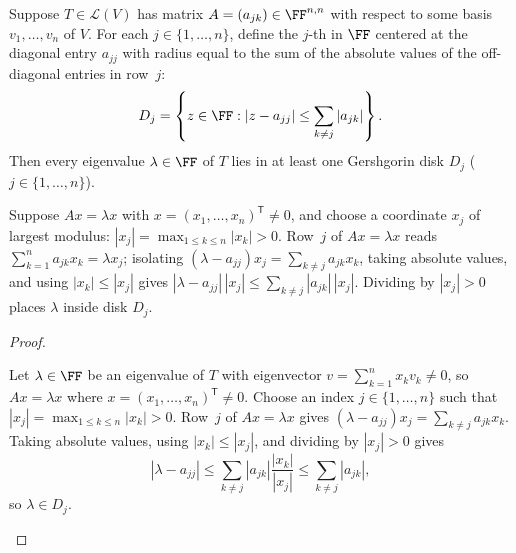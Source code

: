 \documentclass[10pt]{scrartcl}
\newcommand{\LL}{\mathcal L}\newcommand{\PP}{\mathcal P}\newcommand{\MM}{\mathcal M}
\begin{document}
\begin{theorem*}
  Suppose $T\in\LL(V)$ has matrix $A=(a_{jk})\in\FF^{n,n}$ with respect to some basis $v_1,\dots,v_n$ of $V$. For each $j\in\{1,\dots,n\}$, define the $j$-th  in $\FF$ centered at the diagonal entry $a_{jj}$ with radius equal to the sum of the absolute values of the off-diagonal entries in row~$j$:
  \[
    D_j = \left\{ z\in\FF : |z - a_{jj}| \le \sum_{k\ne j} |a_{jk}| \right\}.
  \]
  Then every eigenvalue $\lambda\in\FF$ of $T$ lies in at least one Gershgorin disk $D_j$ ($j\in\{1,\dots,n\}$).
\end{theorem*}
\begin{ideabox}
  Suppose $Ax=\lambda x$ with $x=(x_1,\dots,x_n)^{\mathsf T}\ne 0$, and choose a coordinate $x_j$ of largest modulus: $|x_j|=\max_{1\le k\le n}|x_k|>0$. Row~$j$ of $Ax=\lambda x$ reads $\sum_{k=1}^n a_{jk}x_k=\lambda x_j$; isolating $(\lambda-a_{jj})x_j=\sum_{k\ne j}a_{jk}x_k$, taking absolute values, and using $|x_k|\le|x_j|$ gives $|\lambda-a_{jj}|\,|x_j|\le\sum_{k\ne j}|a_{jk}|\,|x_j|$. Dividing by $|x_j|>0$ places $\lambda$ inside disk $D_j$.
\end{ideabox}
\begin{proof}
  \begin{steps}
    \ii Let $\lambda\in\FF$ be an eigenvalue of $T$ with eigenvector $v=\sum_{k=1}^n x_kv_k\ne 0$, so $Ax=\lambda x$ where $x=(x_1,\dots,x_n)^{\mathsf T}\ne 0$.
    \ii Choose an index $j\in\{1,\dots,n\}$ such that $|x_j|=\max_{1\le k\le n}|x_k|>0$.
    \ii Row~$j$ of $Ax=\lambda x$ gives $(\lambda-a_{jj})x_j=\sum_{k\ne j}a_{jk}x_k$. Taking absolute values, using $|x_k|\le|x_j|$, and dividing by $|x_j|>0$ gives
    \[ |\lambda-a_{jj}|\le\sum_{k\ne j}|a_{jk}|\frac{|x_k|}{|x_j|}\le\sum_{k\ne j}|a_{jk}|, \]
    so $\lambda\in D_j$.
  \end{steps}
\end{proof}
\end{document}
